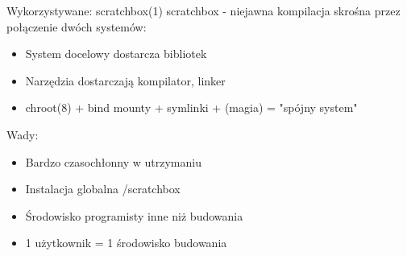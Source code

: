 \documentclass[presentation,aspectratio=43,12pt]{beamer}
\begin{document}
\begin{frame}[label=sec-3-1]{Wykorzystywane: scratchbox(1)}
scratchbox - niejawna kompilacja skrośna przez połączenie dwóch systemów:

\begin{itemize}
\item System docelowy dostarcza bibliotek
\item Narzędzia dostarczają kompilator, linker
\item chroot(8) + bind mounty + symlinki + (magia) = "spójny system"
\end{itemize}

\pause
Wady:
\begin{itemize}
\item Bardzo czasochłonny w utrzymaniu

\item Instalacja globalna /scratchbox

\item Środowisko programisty inne niż budowania

\item 1 użytkownik = 1 środowisko budowania
\end{itemize}


\end{frame}
\end{document}
